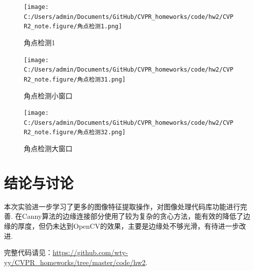\documentclass[12pt, a4paper, oneside]{ctexart}
\numberwithin{equation}{section}  %
\begin{document}
\begin{figure}[htbp]
    \centering
    \texttt{[image: C:/Users/admin/Documents/GitHub/CVPR\_homeworks/code/hw2/CVPR2\_note.figure/角点检测1.png]}
    \caption{角点检测1\label{fig-9}}
\end{figure}

\begin{figure}[htbp]
    \centering
    \texttt{[image: C:/Users/admin/Documents/GitHub/CVPR\_homeworks/code/hw2/CVPR2\_note.figure/角点检测31.png]}
    \caption{角点检测小窗口\label{fig-10}}
\end{figure}

\begin{figure}[htbp]
    \centering
    \texttt{[image: C:/Users/admin/Documents/GitHub/CVPR\_homeworks/code/hw2/CVPR2\_note.figure/角点检测32.png]}
    \caption{角点检测大窗口\label{fig-11}}
\end{figure}
\vspace*{-1cm}
\section{结论与讨论}
本次实验进一步学习了更多的图像特征提取操作，对图像处理代码库功能进行完善. 在Canny算法的边缘连接部分使用了较为复杂的贪心方法，能有效的降低了边缘的厚度，但仍未达到OpenCV的效果，主要是边缘处不够光滑，有待进一步改进.

完整代码请见：\url{https://github.com/wty-yy/CVPR_homeworks/tree/master/code/hw2}.
\end{document}

